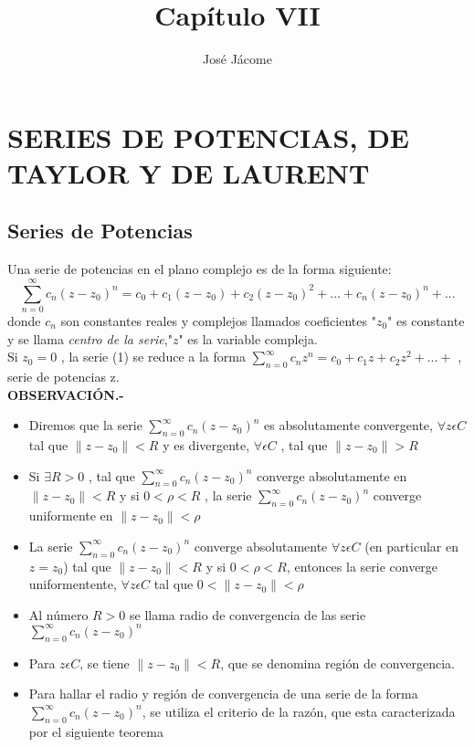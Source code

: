\documentclass[10pt,a4paper]{article}
\author{José Jácome}
\title{Capítulo VII}
\begin{document}
\section{SERIES DE POTENCIAS, DE TAYLOR Y DE LAURENT}
\subsection{Series de Potencias}
Una serie de potencias en el plano complejo es de la forma siguiente:
\begin{equation}
\sum_{n = 0}^{\infty} c_n (z-z_0)^n = c_0 + c_1(z-z_0) + c_2 (z-z_0)^2 + ... +  c_n (z-z_0)^n + ...
\end{equation}
donde $c_n$ son constantes reales y complejos llamados coeficientes "$z_0$" es constante y se llama \textit{centro de la serie},"$z$" es la variable compleja. \\
Si $z_0 = 0$ , la serie (1) se reduce a la forma $\displaystyle{\sum_{n = 0}^{\infty} c_n z^n = c_0 + c_1 z + c_2 z^2 + ... + }$ , serie de potencias z.\\
\textbf{OBSERVACIÓN.-}
\begin{itemize}
\item Diremos que la serie $\displaystyle{\sum_{n = 0}^{\infty} c_n (z-z_0)^n}$ es absolutamente convergente, $\forall z \epsilon C$ tal que $ \parallel z - z_0 \parallel  < R$ y es divergente, $\forall \epsilon  C$ , tal que $\parallel z - z_0 \parallel > R$
\item Si $\exists R > 0$ , tal que $\displaystyle{\sum_{n = 0}^{\infty} c_n (z-z_0)^n}$ converge absolutamente en $\parallel z - z_0 \parallel < R$ y si $0 < \rho < R$ , la serie $\displaystyle{\sum_{n = 0}^{\infty} c_n (z-z_0)^n}$ converge uniformente en $\parallel z - z_0 \parallel < \rho$
\item La serie $\displaystyle{\sum_{n = 0}^{\infty} c_n (z-z_0)^n}$ converge absolutamente  $\forall z \epsilon C$ (en particular en $z = z_0$) tal que $\parallel z - z_0 \parallel < R $ y si $0 < \rho < R$, entonces la serie converge uniformentente, $\forall z \epsilon C$ tal que $0< \parallel z - z_0 \parallel < \rho$
\item Al número $R > 0$ se llama radio de convergencia de las serie $\displaystyle{\sum_{n = 0}^{\infty} c_n (z-z_0)^n}$
\item Para $z \epsilon C$, se tiene $\parallel z - z_0 \parallel < R$, que se denomina región de convergencia.

\item Para hallar el radio y región de convergencia de una serie de la forma $\displaystyle{\sum_{n = 0}^{\infty} c_n (z-z_0)^n}$, se utiliza el criterio de la razón, que esta caracterizada por el siguiente teorema
\end{itemize}
\end{document}

